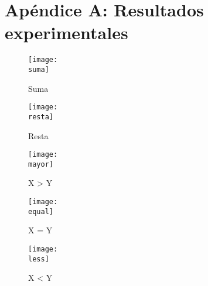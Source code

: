\documentclass[a4paper, 12pt]{article}
\newcommand{\suma}{imag/fourierB.png}
\newcommand{\resta}{imag/graffA1.png}
\newcommand{\equal}{imag/graffA2.png}
\newcommand{\less}{imag/graffA3.png}
\newcommand{\mayor}{imag/graffA4.png}
\begin{document}
    \section*{Apéndice A: Resultados experimentales}
    \begin{figure}[H]
        \centering
        \texttt{[image: \\suma]}
        \caption{Suma}
    \end{figure}
    \begin{figure}[H]
        \centering
        \texttt{[image: \\resta]}
        \caption{Resta}
    \end{figure}
    \begin{figure}[H]
        \centering
        \texttt{[image: \\mayor]}
        \caption{X > Y}
    \end{figure}
    \begin{figure}[H]
        \centering
        \texttt{[image: \\equal]}
        \caption{X = Y}
    \end{figure}
    \begin{figure}[H]
        \centering
        \texttt{[image: \\less]}
        \caption{X < Y}
    \end{figure}
\end{document}
